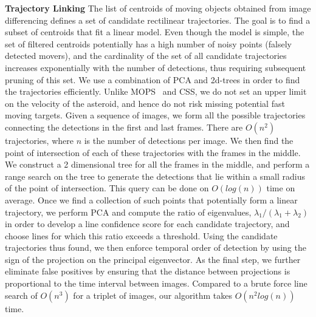 \documentclass{article}
\begin{document}
{\bf Trajectory Linking}
The list of centroids of moving objects obtained from image differencing defines a set of candidate rectilinear trajectories.  The goal is to find a subset of centroids that fit a linear model. Even though the model is simple, the set of filtered centroids potentially has a high number of noisy points (falsely detected movers), and the cardinality of the set of all candidate trajectories increases exponentially with the number of detections, thus requiring subsequent pruning of this set. We use a combination of PCA and 2d-trees in order to find the trajectories efficiently. Unlike MOPS~\cite{denneau2013pan} and CSS\cite{css2014}, we do not set an upper limit on the velocity of the asteroid, and hence do not risk missing potential fast moving targets. Given a sequence of images, we form all the possible trajectories connecting the detections in the first and last frames. There are $O(n^2)$ trajectories, where $n$ is the number of detections per image. We then find the point of intersection of each of these trajectories with the frames in the middle. We construct a 2 dimensional tree for all the frames in the middle, and perform a range search on the tree to generate the detections that lie within a small radius of the point of intersection. This query can be done on $O(log(n))$ time on average. Once we find a collection of such points that potentially form a linear trajectory, we perform PCA and compute the ratio of eigenvalues, $\lambda_{1}/(\lambda_{1}+ \lambda_{2})$ in order to develop a line confidence score for each candidate trajectory, and choose lines for which this ratio exceeds a threshold. Using the candidate trajectories thus found, we then enforce temporal order of detection by using the sign of the projection on the principal eigenvector.  As the final step, we further eliminate false positives by ensuring that the distance between projections is proportional to the time interval between images. Compared to a brute force line search of $O(n^3)$ for a triplet of images, our algorithm takes $O(n^2log(n))$ time.
\end{document}

